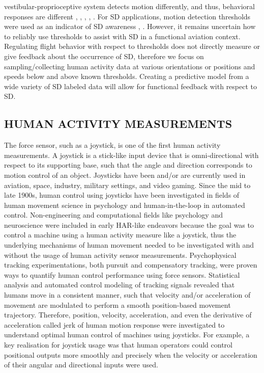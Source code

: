 \documentclass{ieeeaccess}
\begin{document}
vestibular-proprioceptive system detects motion differently, and thus, behavioral responses are different \cite{Soyka_2011_Predicting}, \cite{Valko_2012_Vestibular}, \cite{Hartmann_2014_Direction}, \cite{BermudezRey_2016_Vestibular}, \cite{Karmali_2017_Multivariate}. For SD applications, motion detection thresholds were used as an indicator of SD awareness \cite{Gillingham_1993_Spatial}, \cite{Previc_2004_Spatial}. However, it remains uncertain how to reliably use thresholds to assist with SD in a functional aviation context. Regulating flight behavior with respect to thresholds does not directly measure or give feedback about the occurrence of SD, therefore we focus on sampling/collecting human activity data at various orientations or positions and speeds below and above known thresholds. Creating a predictive model from a wide variety of SD labeled data will allow for functional feedback with respect to SD.

\subsection{HUMAN ACTIVITY MEASUREMENTS}
The force sensor, such as a joystick, is one of the first human activity measurements. A joystick is a stick-like input device that is omni-directional with respect to its supporting base, such that the angle and direction corresponds to motion control of an object. Joysticks have been and/or are currently used in aviation, space, industry, military settings, and video gaming. Since the mid to late 1900s, human control using joysticks have been investigated in fields of human movement science in psychology and human-in-the-loop in automated control. Non-engineering and computational fields like psychology and neuroscience were included in early HAR-like endeavors because the goal was to control a machine using a human activity measure like a joystick, thus the underlying mechanisms of human movement needed to be investigated with and without the usage of human activity sensor measurements. Psychophysical tracking experimentations, both pursuit and compensatory tracking, were proven ways to quantify human control performance using force sensors. Statistical analysis and automated control modeling of tracking signals revealed that humans move in a consistent manner, such that velocity and/or acceleration of movement are modulated to perform a smooth position-based movement trajectory. Therefore, position, velocity, acceleration, and even the derivative of acceleration called jerk of human motion response were investigated to understand optimal human control of machines using joysticks. For example, a key realisation for joystick usage was that human operators could control positional outputs more smoothly and precisely when the velocity or acceleration of their angular and directional inputs were used.
\end{document}
